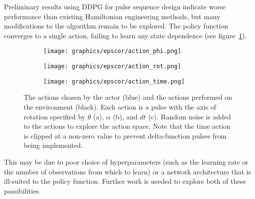 \documentclass{article}
\begin{document}
Preliminary results using DDPG for pulse sequence design indicate worse performance than existing Hamiltonian engineering methods, but many modifications to the algorithm remain to be explored.
The policy function converges to a single action, failing to learn any state dependence (see figure~\ref{fig:actions}).
\begin{figure}
    \centering
    \begin{subfigure}{.48\textwidth}
        \centering
        \texttt{[image: graphics/epscor/action\_phi.png]}
        \caption{}
    \end{subfigure}
    \begin{subfigure}{.48\textwidth}
        \centering
        \texttt{[image: graphics/epscor/action\_rot.png]}
        \caption{}
    \end{subfigure}
    \begin{subfigure}{.48\textwidth}
        \centering
        \texttt{[image: graphics/epscor/action\_time.png]}
        \caption{}
    \end{subfigure}
    \caption{The actions chosen by the actor (blue) and the actions performed on the environment (black). Each action is a pulse with the axis of rotation specified by $\theta$ (a), $\alpha$ (b), and $dt$ (c). Random noise is added to the actions to explore the action space. Note that the time action is clipped at a non-zero value to prevent delta-function pulses from being implemented.}
    \label{fig:actions}
\end{figure}
This may be due to poor choice of hyperparameters (such as the learning rate or the number of observations from which to learn) or a network architecture that is ill-suited to the policy function. Further work is needed to explore both of these possibilities.

\printbibliography
\end{document}
